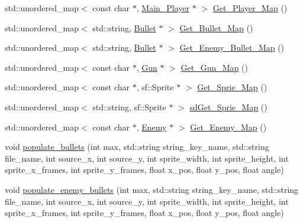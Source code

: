 \begin{DoxyCompactItemize}
\item 
std\+::unordered\+\_\+map$<$ const char $\ast$, \hyperlink{classSekander_1_1Main__Player}{Main\+\_\+\+Player} $\ast$ $>$ \hyperlink{classSekander_1_1LoadingGameObjects_a5561e4d9c2379c0e909e726b2c3a8cfa}{Get\+\_\+\+Player\+\_\+\+Map} ()
\item 
std\+::unordered\+\_\+map$<$ std\+::string, \hyperlink{classSekander_1_1Bullet}{Bullet} $\ast$ $>$ \hyperlink{classSekander_1_1LoadingGameObjects_af3f164ef410cb0c151c55cca1460ae75}{Get\+\_\+\+Bullet\+\_\+\+Map} ()
\item 
std\+::unordered\+\_\+map$<$ std\+::string, \hyperlink{classSekander_1_1Bullet}{Bullet} $\ast$ $>$ \hyperlink{classSekander_1_1LoadingGameObjects_a53cf99dbb68677f73ac858d00173d7f6}{Get\+\_\+\+Enemy\+\_\+\+Bullet\+\_\+\+Map} ()
\item 
std\+::unordered\+\_\+map$<$ const char $\ast$, \hyperlink{classSekander_1_1Gun}{Gun} $\ast$ $>$ \hyperlink{classSekander_1_1LoadingGameObjects_a9917c859d5dd99dd02e48facc068c3ae}{Get\+\_\+\+Gun\+\_\+\+Map} ()
\item 
std\+::unordered\+\_\+map$<$ const char $\ast$, sf\+::\+Sprite $\ast$ $>$ \hyperlink{classSekander_1_1LoadingGameObjects_ac23927738816c3a6bd575483c233d456}{Get\+\_\+\+Sprie\+\_\+\+Map} ()
\item 
std\+::unordered\+\_\+map$<$ std\+::string, sf\+::\+Sprite $\ast$ $>$ \hyperlink{classSekander_1_1LoadingGameObjects_a58857b9a3697137ddf9ad7c161f84fd6}{sd\+Get\+\_\+\+Sprie\+\_\+\+Map} ()
\item 
std\+::unordered\+\_\+map$<$ const char $\ast$, \hyperlink{classSekander_1_1Enemy}{Enemy} $\ast$ $>$ \hyperlink{classSekander_1_1LoadingGameObjects_af1d51f5b67f7476c022f8161323734bd}{Get\+\_\+\+Enemy\+\_\+\+Map} ()
\item 
void \hyperlink{classSekander_1_1LoadingGameObjects_a87c64fc0bc77941f9753e7813e623075}{populate\+\_\+bullets} (int max, std\+::string string\+\_\+key\+\_\+name, std\+::string file\+\_\+name, int source\+\_\+x, int source\+\_\+y, int sprite\+\_\+width, int sprite\+\_\+height, int sprite\+\_\+x\+\_\+frames, int sprite\+\_\+y\+\_\+frames, float x\+\_\+pos, float y\+\_\+pos, float angle)
\item 
void \hyperlink{classSekander_1_1LoadingGameObjects_ae0c8e87b730092dd7129cb9edae07aca}{populate\+\_\+enemy\+\_\+bullets} (int max, std\+::string string\+\_\+key\+\_\+name, std\+::string file\+\_\+name, int source\+\_\+x, int source\+\_\+y, int sprite\+\_\+width, int sprite\+\_\+height, int sprite\+\_\+x\+\_\+frames, int sprite\+\_\+y\+\_\+frames, float x\+\_\+pos, float y\+\_\+pos, float angle)
\end{DoxyCompactItemize}
